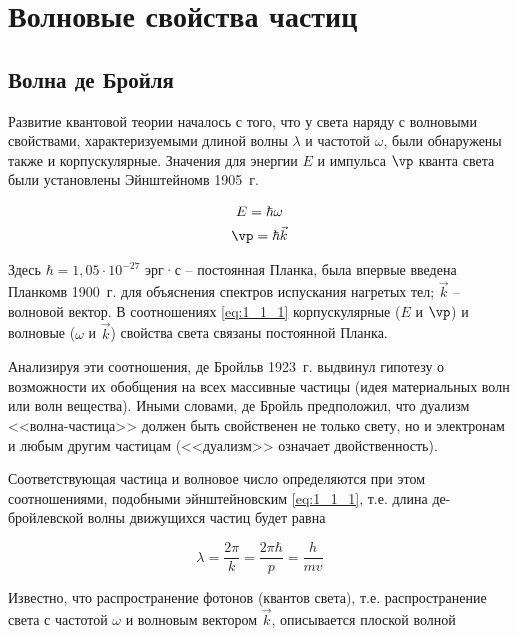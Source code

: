 \chapter{Волновые свойства частиц}

\section{Волна де Бройля}

Развитие квантовой теории началось с того, что у света наряду с волновыми свойствами, характеризуемыми длиной волны $\lambda$ и частотой $\omega$, были обнаружены также и корпускулярные. Значения для энергии $E$ и импульса $\vp$ кванта света были установлены Эйнштейном\footnotemark в 1905~г.

\begin{equation}
\label{eq:1_1_1}
\begin{gathered}
E = \hbar \omega \\ 
\vp = \hbar \vec{k}
\end{gathered}
\end{equation}

Здесь $\hbar = 1{,}05 \cdot 10^{-27}$ эрг·с -- постоянная Планка, была впервые введена Планком\footnotemark в 1900~г. для объяснения спектров испускания нагретых тел; $\vec{k}$ -- волновой вектор. В соотношениях \eqref{eq:1_1_1} корпускулярные ($E$ и $\vp$) и волновые ($\omega$ и $\vec{k}$) свойства света связаны постоянной Планка.

Анализируя эти соотношения, де Бройль\footnotemark в 1923~г. выдвинул гипотезу о возможности их обобщения на всех массивные частицы (идея материальных волн или волн вещества). Иными словами, де Бройль предположил, что дуализм <<волна-частица>> должен быть свойственен не только свету, но и электронам и любым другим частицам (<<дуализм>> означает двойственность).

Соответствующая частица и волновое число определяются при этом соотношениями, подобными эйнштейновским \eqref{eq:1_1_1}, т.е. длина де-бройлевской волны движущихся частиц будет равна

\begin{equation}
\label{eq:1_1_2}
\lambda = \frac{2\pi}{k} = \frac{2\pi \hbar}{p} = \frac{h}{mv}
\end{equation}

Известно, что распространение фотонов (квантов света), т.е. распространение света с частотой $\omega$ и волновым вектором $\vec{k}$, описывается плоской волной

